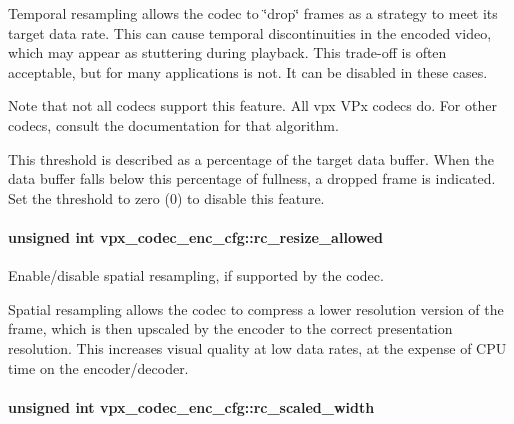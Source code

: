Temporal resampling allows the codec to \char`\"{}drop\char`\"{} frames as a strategy to meet its target data rate. This can cause temporal discontinuities in the encoded video, which may appear as stuttering during playback. This trade-\/off is often acceptable, but for many applications is not. It can be disabled in these cases.

Note that not all codecs support this feature. All vpx V\+Px codecs do. For other codecs, consult the documentation for that algorithm.

This threshold is described as a percentage of the target data buffer. When the data buffer falls below this percentage of fullness, a dropped frame is indicated. Set the threshold to zero (0) to disable this feature. 
\paragraph[{\texorpdfstring{rc\+\_\+resize\+\_\+allowed}{rc_resize_allowed}}]{\setlength{\rightskip}{0pt plus 5cm}unsigned int vpx\+\_\+codec\+\_\+enc\+\_\+cfg\+::rc\+\_\+resize\+\_\+allowed}\hypertarget{structvpx__codec__enc__cfg_a02a4e2f18fb0fdfff44df8b0d9a99d6c}{}\label{structvpx__codec__enc__cfg_a02a4e2f18fb0fdfff44df8b0d9a99d6c}


Enable/disable spatial resampling, if supported by the codec. 

Spatial resampling allows the codec to compress a lower resolution version of the frame, which is then upscaled by the encoder to the correct presentation resolution. This increases visual quality at low data rates, at the expense of C\+PU time on the encoder/decoder. 
\paragraph[{\texorpdfstring{rc\+\_\+scaled\+\_\+width}{rc_scaled_width}}]{\setlength{\rightskip}{0pt plus 5cm}unsigned int vpx\+\_\+codec\+\_\+enc\+\_\+cfg\+::rc\+\_\+scaled\+\_\+width}\hypertarget{structvpx__codec__enc__cfg_a2edc2097b6c74f837f129d3cc8901fca}{}\label{structvpx__codec__enc__cfg_a2edc2097b6c74f837f129d3cc8901fca}


